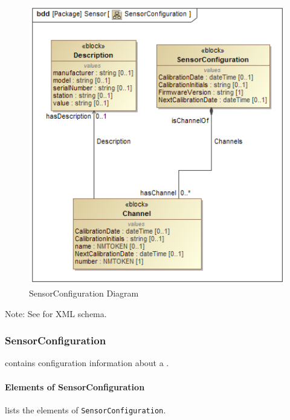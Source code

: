 \begin{figure}[ht]
  \centering
    \includegraphics[width=1.0\textwidth]{figures/SensorConfiguration.png}
  \caption{SensorConfiguration Diagram}
  \label{fig:SensorConfiguration Diagram}
\end{figure}

\FloatBarrier


Note: See  for XML schema.



\subsubsection{SensorConfiguration}
\label{sec:SensorConfiguration}



 contains configuration information about a .


\paragraph{Elements of SensorConfiguration}\mbox{}
\label{sec:Elements of SensorConfiguration}

 lists the elements of \texttt{SensorConfiguration}.

